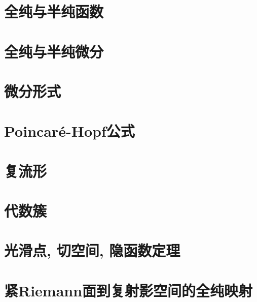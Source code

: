 \section{全纯与半纯函数}\label{s1-3}

\section{全纯与半纯微分}\label{s1-4}

\section{微分形式}\label{s1-5}

\section{Poincar\texorpdfstring{\'e}{e}-Hopf公式}\label{s1-6}

\section{复流形}\label{s1-7}

\section{代数簇}\label{s1-8}

\section{光滑点, 切空间, 隐函数定理}\label{s1-9}

\section{紧Riemann面到复射影空间的全纯映射}\label{s1-15}
